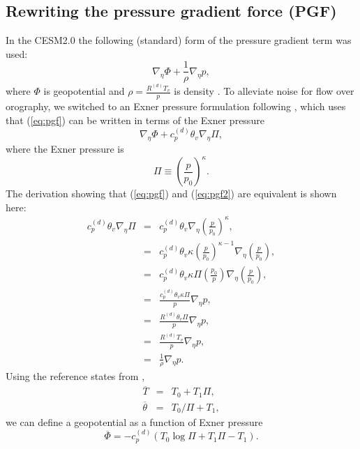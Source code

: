 \documentclass[draft]{agujournal2019}
\begin{document}
\subsection{Rewriting the pressure gradient force (PGF)}
In the CESM2.0 the following (standard) form of the pressure gradient term was used:
\begin{equation}
\label{eq:pgf}
    \nabla_{\eta }\Phi+\frac{1}{\rho}\nabla_{\eta }p,
\end{equation}
where $\Phi$ is geopotential and $\rho=\frac{R^{(d)}T_v}{p}$ is density \cite<for details see >{LetAl2018JAMES}. To alleviate noise for flow over orography, 
 we switched to an Exner pressure formulation following , which uses that (\ref{eq:pgf}) can be written in terms of the Exner pressure
\begin{equation}\label{eq:pgf2}
    \nabla_{\eta }\Phi+c_p^{(d)}\theta_v\nabla_{\eta }\Pi,
\end{equation}
where the Exner pressure is
\begin{equation}
    \Pi\equiv \left( \frac{p}{p_0}\right)^{\kappa}.
\end{equation}
The derivation showing that (\ref{eq:pgf}) and (\ref{eq:pgf2}) are equivalent is shown here:
\begin{eqnarray*}
c_p^{(d)}\theta_v\nabla_{\eta }\Pi &=& c_p^{(d)}\theta_v\nabla_{\eta }\left( \frac{p}{p_0}\right)^{\kappa},\\
&=& c_p^{(d)}\theta_v\kappa\left( \frac{p}{p_0}\right)^{\kappa-1} \nabla_{\eta }\left( \frac{p}{p_0}\right),\\
&=& c_p^{(d)}\theta_v\kappa\Pi\left( \frac{p_0}{p}\right) \nabla_{\eta }\left(\frac{p}{p_0}\right),\\
&=& \frac{c_p^{(d)}\theta_v\kappa\Pi}{p} \nabla_{\eta }p,\\
&=& \frac{R^{(d)}\theta_v\Pi}{p} \nabla_{\eta }p,\\
&=& \frac{R^{(d)}T_v}{p} \nabla_{\eta }p,\\
&=& \frac{1}{\rho} \nabla_{\eta }p.
\end{eqnarray*}
Using the reference states from \cite{SJ1991QJRMS},
\begin{eqnarray}
  \overline{T}&=&T_0+T_1 \Pi,\\
  \overline{\theta}&=&{T_0}/\Pi+T_1,
\end{eqnarray}
we can define a geopotential as a function of Exner pressure
\begin{equation}
    \overline{\Phi} = -c_p^{(d)}\left( T_0\log \Pi+T_1\Pi-T_1\right). 
\end{equation}
\end{document}

